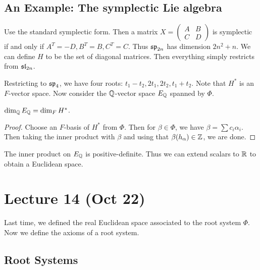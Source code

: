 \documentclass[twoside, 10pt]{article}
\begin{document}
    \subsection{An Example: The symplectic Lie algebra}%
    \label{sub:an_example_the_symplectic_lie_algebra}

    Use the standard symplectic form. Then a matrix $X = \begin{pmatrix} A & B
    \\ C & D \end{pmatrix}$ is symplectic if and only if $A^T = -D, B^T = B,
    C^T = C$. Thus $\mathfrak{sp}_{2n}$ has dimension $2n^2+n$. We can define $H$ to
    be the set of diagonal matrices. Then everything simply restricts from
    $\mathfrak{sl}_{2n}$.

    Restricting to $\mathfrak{sp}_4$, we have four roots: $t_1-t_2, 2t_1, 2t_2,
    t_1+t_2$. Note that $H^*$ is an $F$-vector space. Now consider the
    $\mathbb{Q}$-vector space $E_{\mathbb{Q}}$ spanned by $\Phi$.

    \begin{prop} $\dim_{\mathbb{Q}} E_{\mathbb{Q}} = \dim_F H^*$.  \end{prop}

    \begin{proof} Choose an $F$-basis of $H^*$ from $\Phi$. Then for $\beta \in
    \Phi$, we have $\beta = \sum c_i \alpha_i$. Then taking the inner product
with $\beta$ and using that $\beta(h_{\alpha}) \in \mathbb{Z}$, we are done.
\end{proof}

    \begin{rmk} The inner product on $E_{\mathbb{Q}}$ is positive-definite. Thus we can
    extend scalars to $\mathbb{R}$ to obtain a Euclidean space.  \end{rmk}
    
    \section{Lecture 14 (Oct 22)}%
    
    Last time, we defined the real Euclidean space associated to the root
    system $\Phi$. Now we define the axioms of a root system.

    \subsection{Root Systems}%
    
\end{document}
